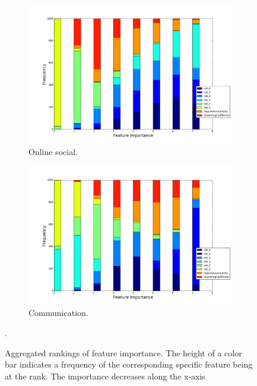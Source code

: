 \documentclass{article}
\begin{document}
\begin{figure}[H]
\medskip
\begin{subfigure}{0.48\textwidth}
\includegraphics[width=\linewidth]{figs/one_by_many/online_social/feature_importance.png}
\caption{Online social.} \label{online_social_feature}
\end{subfigure}\hspace*{\fill}
\begin{subfigure}{0.48\textwidth}
\includegraphics[width=\linewidth]{figs/one_by_many/communication/feature_importance.png}
\caption{Communication.} \label{communication_feature}
\end{subfigure}

\caption{Aggregated rankings of feature importance. The height of a color bar indicates a frequency of the corresponding specific feature being at the rank. The importance decreases along the x-axis} \label{feature_importance_figures}.
\end{figure}
\end{document}
